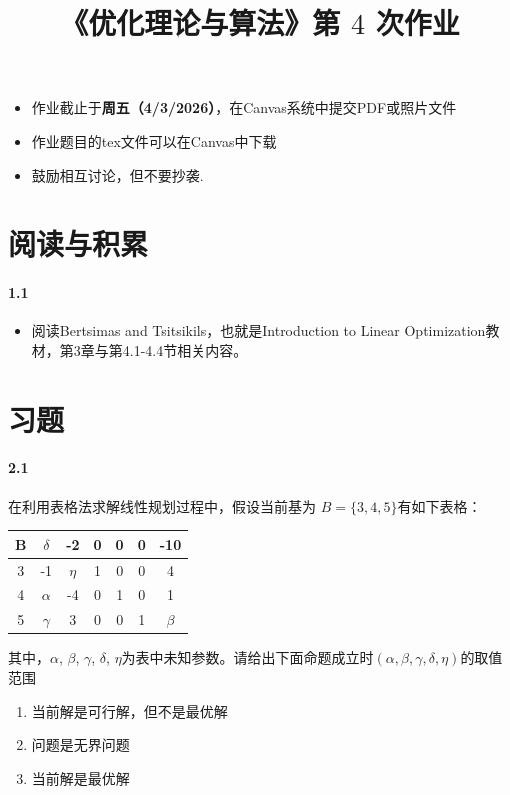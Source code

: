 \documentclass[12pt,a4paper]{article}
\begin{document}
\title{
{《优化理论与算法》第 {$4$} 次作业
}
}
\date{}


\maketitle

\begin{itemize}
	\item 作业截止于{\bf 周五（4/3/2026）}，在Canvas系统中提交PDF或照片文件
	\item 作业题目的tex文件可以在Canvas中下载
	\item 鼓励相互讨论，但不要抄袭.
\end{itemize}

\section{阅读与积累}
\paragraph{1.1}
\begin{itemize}
	\item 阅读Bertsimas and Tsitsikils，也就是Introduction to Linear Optimization教材，第3章与第4.1-4.4节相关内容。
\end{itemize}

\section{习题}


\paragraph{2.1}
在利用表格法求解线性规划过程中，假设当前基为 $B=\{3,4,5\}$有如下表格：
\begin{center}
	\begin{tabular}{|c| c c c c c |c|} 
		\hline
		B & $\delta$ &-2 &0 &0 &0 & -10 \\
		\hline
		3 & -1 & $\eta$ &1 &0 &0 & 4 \\
		4 & $\alpha$ & -4 &0 &1 &0 & 1 \\
		5 & $\gamma$ & 3 &0 &0 &1 & $\beta$ \\
		\hline
	\end{tabular}
\end{center}
其中，$\alpha$, $\beta$, $\gamma$, $\delta$, $\eta$为表中未知参数。请给出下面命题成立时$(\alpha, \beta, \gamma, \delta, \eta)$的取值范围
\begin{enumerate}
	\item 当前解是可行解，但不是最优解
	\item 问题是无界问题
	\item 当前解是最优解
\end{enumerate}
\end{document}
